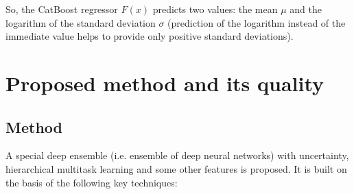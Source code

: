 \documentclass{article}
\begin{document}
So, the CatBoost regressor \(F(x)\) predicts two values: the mean \(\mu\) and the logarithm of the standard deviation \(\sigma\) (prediction of the logarithm instead of the immediate value helps to provide only positive standard deviations).

\section{Proposed method and its quality}
\label{snn}

\subsection{Method}

A special deep ensemble (i.e. ensemble of deep neural networks) with uncertainty, hierarchical multitask learning and some other features is proposed. It is built on the basis of the following key techniques:
\end{document}
